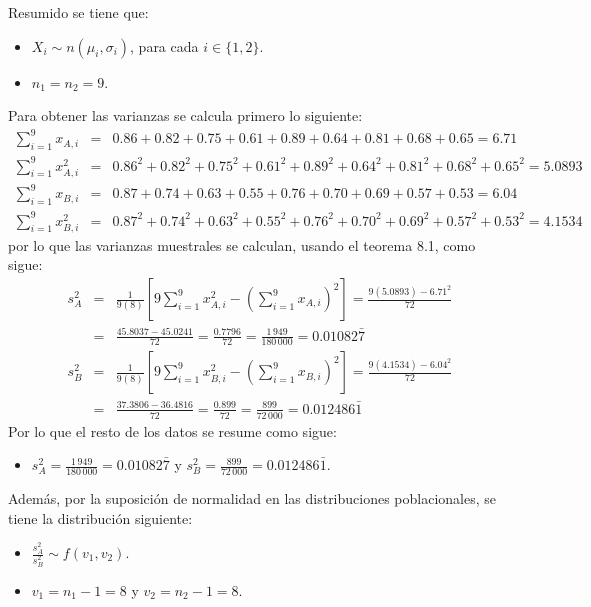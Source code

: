\begin{solucion}
 \begin{datos}
  Resumido se tiene que:
  \begin{itemize}
   \item $X_i \sim n\left( \mu_i, \sigma_i \right)$, para cada $i \in \{1,2\}$.
   \item $n_1 = n_2 = 9$.
  \end{itemize}
  Para obtener las varianzas se calcula primero lo siguiente:
  \begin{eqnarray*}
   \sum_{i=1}^{9} x_{A,i} & = &
   0.86 + 0.82 + 0.75 + 0.61 + 0.89 + 0.64 + 0.81 + 0.68 + 0.65 = 6.71 \\
   \sum_{i=1}^{9} x_{A,i}^2 & = & 
   0.86^2 + 0.82^2 + 0.75^2 + 0.61^2 + 0.89^2 + 0.64^2 + 0.81^2 + 0.68^2 +
   0.65^2 = 5.0893 \\
   \sum_{i=1}^{9} x_{B,i} & = &
   0.87 + 0.74 + 0.63 + 0.55 + 0.76 + 0.70 + 0.69 + 0.57 + 0.53 = 6.04 \\
   \sum_{i=1}^{9} x_{B,i}^2 & = &
   0.87^2 + 0.74^2 + 0.63^2 + 0.55^2 + 0.76^2 + 0.70^2 + 0.69^2 + 0.57^2 +
   0.53^2 = 4.1534
  \end{eqnarray*}
  por lo que las varianzas muestrales se calculan, usando el teorema 8.1,
  como sigue:
  \begin{eqnarray*}
   s_A^2 & = &
   \frac{1}{9(8)}
   \left[ 9\sum_{i=1}^9 x_{A,i}^2 -
   \left( \sum_{i=1}^9 x_{A,i} \right)^2 \right]
   = \frac{9(5.0893) - 6.71^2}{72} \\
   & = & \frac{45.8037 - 45.0241}{72} = \frac{0.7796}{72}
   = \frac{1\,949}{180\,000} = 0.01082\bar{7} \\
   s_B^2 & = &
   \frac{1}{9(8)}
   \left[ 9\sum_{i=1}^9 x_{B,i}^2 -
   \left( \sum_{i=1}^9 x_{B,i} \right)^2 \right]
   = \frac{9(4.1534) - 6.04^2}{72} \\
   & = & \frac{37.3806 - 36.4816}{72}
   = \frac{0.899}{72} = \frac{899}{72\,000} = 0.012486\bar{1}
  \end{eqnarray*}
  Por lo que el resto de los datos se resume como sigue:
  \begin{itemize}
   \item $s_A^2 = \frac{1\,949}{180\,000} = 0.01082\bar{7}$
   y $s_B^2 = \frac{899}{72\,000} = 0.012486\bar{1}$.
  \end{itemize}
  Adem\'as, por la suposici\'on de normalidad en las distribuciones
  poblacionales, se tiene la distribuci\'on siguiente:
  \begin{itemize}
   \item $\frac{s_A^2}{s_B^2} \sim f(v_1,v_2)$.
   \item $v_1 = n_1 - 1 = 8$ y $v_2 = n_2 - 1 = 8$.
  \end{itemize}
 \end{datos}


\end{solucion}
